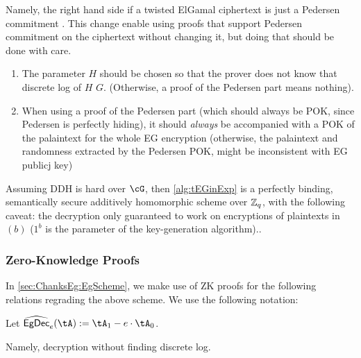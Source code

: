 Namely, the right hand side if a twisted ElGamal ciphertext is just a  Pedersen  commitment \cite{Pedersen91}. This change enable  using proofs that  support  Pedersen commitment on the ciphertext without changing it, but doing that  should be done with care.
\begin{enumerate}
	\item The parameter $H$ should be chosen so that the prover does not know that discrete log of $H$ \wrt $G$. (Otherwise, a proof of the Pedersen part means nothing).
	
	\item When using a proof of  the Pedersen part (which should always be POK, since Pedersen is perfectly hiding), it should \emph{always} be accompanied with a POK of the palaintext for the whole EG encryption (otherwise, the palaintext and randomness  extracted by the  Pedersen POK, might be  inconsistent with  EG publicj key)  
\end{enumerate}

\begin{theorem}\label{thm:tEGinExp}
	Assuming DDH is hard over $\cG$, then \cref{alg:tEGinExp} is  a perfectly binding,  semantically secure additively homomorphic scheme over ${\mathbb Z}_q$, with the following caveat:  the decryption  only guaranteed to work on encryptions of plaintexts in $(b)$ ($1^b$ is the parameter of the key-generation algorithm)..
\end{theorem}



\subsubsection{Zero-Knowledge Proofs}\label{sec:ChanksEg:Eg:ZK}


In \cref{sec:ChanksEg:EgScheme}, we make use of ZK proofs for the following relations regrading the above scheme.   We use the following notation:
\begin{notation}
Let   $\wEgDec_e (\tA) \eqdef \tA_1- e\cdot \tA_0$.  
\end{notation}
Namely, decryption without finding discrete log.  


